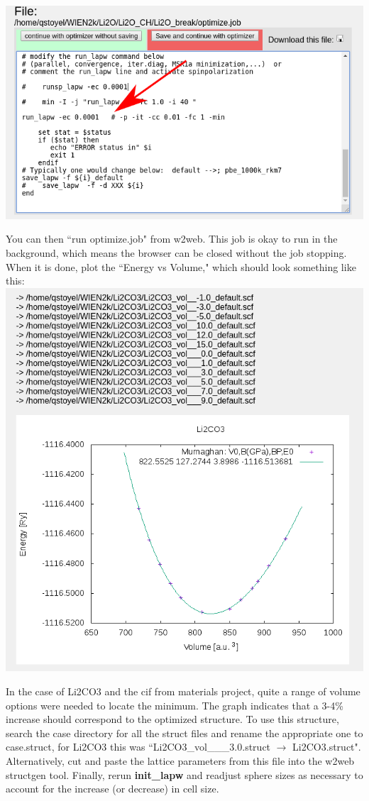 \documentclass[12pt]{article}
\begin{document}
\includegraphics[scale=0.4]{./images/vol_opt2.png}

You can then ``run optimize.job" from w2web. This job is okay to run in the background, which means the browser can be closed without the job stopping.  When it is done, plot the ``Energy vs Volume," which should look something like this:\\
  
\includegraphics[scale=0.3]{./images/E_vs_V.png}

In the case of Li2CO3 and the cif from materials project, quite a range of volume options were needed to locate the minimum.  The graph indicates that a 3-4\% increase should correspond to the optimized structure.  To use this structure, search the case directory for all the struct files and rename the appropriate one to case.struct, for Li2CO3 this was ``Li2CO3\_vol\_\_\_3.0.struct $\to$ Li2CO3.struct". Alternatively, cut and paste the lattice parameters from this file into the w2web structgen tool.    Finally, rerun \textbf{init\_lapw} and readjust sphere sizes as necessary to account for the increase (or decrease) in cell size. 
\end{document}

